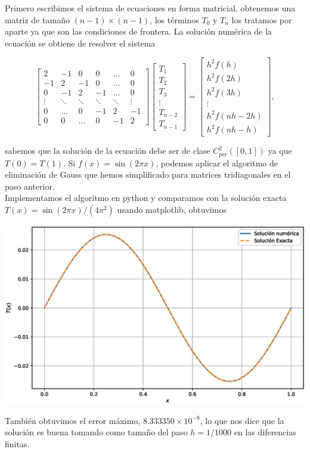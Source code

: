 \begin{solution}
    Primero escribimos el sistema de ecuaciones en forma matricial, obtenemos una matriz de tamaño $(n-1)\times (n-1)$, los términos $T_0 $ y $T_n$ los tratamos por aparte ya que son las condiciones de frontera. La solución numérica de la ecuación se obtiene de resolver el sistema

    $$
\left[\begin{array}{rrrrrr}
2 & -1 & 0 & 0 & \ldots & 0 \\
-1 & 2 & -1 & 0 & \ldots & 0 \\
0 & -1 & 2 & -1 & \ldots & 0 \\
\vdots & \ddots & \ddots & \ddots & \ddots & \vdots \\
0 & \ldots & 0 & -1 & 2 & -1 \\
0 & 0 & \ldots & 0 & -1 & 2
\end{array}\right]\left[\begin{array}{c}
T_1 \\
T_2 \\
T_3 \\
\vdots \\
T_{n-2} \\
T_{n-1}
\end{array}\right]=\left[\begin{array}{c}
h^2 f(h)\\
h^2 f(2h) \\
h^2 f(3h) \\
\vdots \\
h^2 f(nh-2h) \\
h^2 f(nh-h)
\end{array}\right],
$$

sabemos que la solución de la ecuación debe ser de clase $C^2_{\text{per}}([0,1])$ ya que $T(0)=T(1)$. Si $f(x)=\sin(2\pi x)$, podemos aplicar el algoritmo de eliminación de Gauss que hemos simplificado para matrices tridiagonales en el paso anterior.\\

Implementamos el algoritmo en python y comparamos con la solución exacta $T(x)=\sin(2\pi x)/(4\pi^2)$ usando matplotlib, obtuvimos

\begin{center}
    \includegraphics[scale=0.6]{Nucoyoyoyoyoyoyoyo.eps}
\end{center}

También obtuvimos el error máximo, $8.333350\times 10^{-8}$, lo que nos dice que la solución es buena tomando como tamaño del paso $h=1/1000$ en las diferencias finitas.

\end{solution}